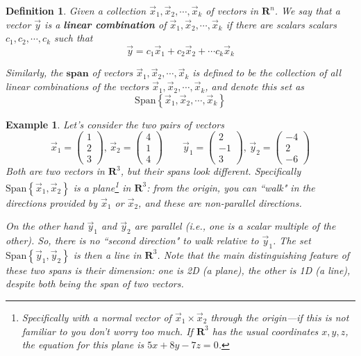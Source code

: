 \documentclass[12pt]{article}
\numberwithin{equation}{subsection}
\numberwithin{figure}{subsection}
\newtheorem{defn}[subsection]{Definition}
\theoremstyle{note}
\newtheorem{example}[subsection]{Example}
\newcommand\Span[1]{\mathrm{Span}\left\{#1\right\}}
\begin{document}
\begin{defn} Given a collection $\vec{x}_1, \vec{x}_2, \cdots, \vec{x}_k$ of vectors in $\mathbf{R}^n$. We say that a vector $\vec{y}$ is a \textbf{linear combination} of $\vec{x}_1, \vec{x}_2, \cdots, \vec{x}_k$ if there are scalars scalars $c_1, c_2, \cdots, c_k$ such that \begin{equation} \vec{y}=c_1 \vec{x}_1+ c_2\vec{x}_2 + \cdots c_k \vec{x}_k\end{equation}

Similarly, the $\textbf{span}$ of vectors $\vec{x}_1, \vec{x}_2, \cdots, \vec{x}_k$ is defined to be the collection of all linear combinations of the vectors $\vec{x}_1, \vec{x}_2, \cdots, \vec{x}_k$, and denote this set as \begin{equation}\Span{\vec{x}_1, \vec{x}_2, \cdots, \vec{x}_k}\end{equation}
\end{defn}

\begin{example}
	Let's consider the two pairs of vectors  \[ \vec{x}_1 = \begin{pmatrix} 1 \\ 2 \\ 3\end{pmatrix}, \, \vec{x}_2 = \begin{pmatrix} 4 \\ 1\\ 4\end{pmatrix} \qquad \vec{y}_1 =\begin{pmatrix} 2 \\ -1 \\ 3\end{pmatrix}, \,\vec{y}_2=\begin{pmatrix} -4 \\ 2 \\ -6 \end{pmatrix} \] Both are two vectors in $\mathbf{R}^3$, but their spans look different. Specifically $\Span{\vec{x}_1, \vec{x}_2}$ is a \textit{plane}\footnote{Specifically with a normal vector of $\vec{x}_1 \times \vec{x}_2$ through the origin---if this is not familiar to you don't worry too much. If $\mathbf{R}^3$ has the usual coordinates $x,y,z$, the equation for this plane is $5x+8y-7z=0$.} in $\mathbf{R}^3$: from the origin, you can ``walk" in the directions provided by $\vec{x}_1$ or $\vec{x}_2$, and these are non-parallel directions. 
	
	On the other hand $\vec{y}_1$ and $\vec{y}_2$ are \textit{parallel} (i.e., one is a scalar multiple of the other). So, there is no ``second direction" to walk relative to $\vec{y}_1$. The set $\Span{\vec{y}_1, \vec{y}_2}$ is then a \textit{line} in $\mathbf{R}^3$. Note that the main distinguishing feature of these two spans is their dimension: one is 2D (a plane), the other is 1D (a line), despite both being the span of two vectors.  
\end{example}
\end{document}
